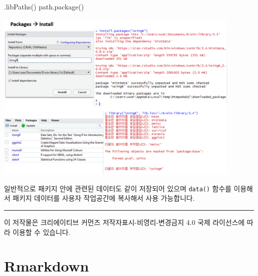 \documentclass[
]{book}
\newenvironment{Shaded}{\begin{snugshade}}{\end{snugshade}}
\newcommand{\AttributeTok}[1]{\textcolor[rgb]{0.77,0.63,0.00}{#1}}
\newcommand{\FunctionTok}[1]{\textcolor[rgb]{0.00,0.00,0.00}{#1}}
\newcommand{\NormalTok}[1]{#1}
\newcommand{\SpecialCharTok}[1]{\textcolor[rgb]{0.00,0.00,0.00}{#1}}
\newcommand{\StringTok}[1]{\textcolor[rgb]{0.31,0.60,0.02}{#1}}
\begin{document}
\begin{Shaded}
\begin{Highlighting}[]
\FunctionTok{.libPaths}\NormalTok{()}
\FunctionTok{path.package}\NormalTok{()}
\end{Highlighting}
\end{Shaded}

\includegraphics[width=4.6875in,height=\textheight]{images/01/01-19.PNG}

일반적으로 패키지 안에 관련된 데이터도 같이 저장되어 있으며 \texttt{data()} 함수를 이용해서 패키지 데이터를 사용자 작업공간에 복사해서 사용 가능합니다.

\begin{Shaded}
\end{Shaded}

\begin{center}\rule{0.5\linewidth}{0.5pt}\end{center}

이 저작물은 크리에이티브 커먼즈 저작자표시-비영리-변경금지 4.0 국제 라이선스에 따라 이용할 수 있습니다.

\hypertarget{rmarkdown}{%
\chapter{Rmarkdown}\label{rmarkdown}}
\end{document}
